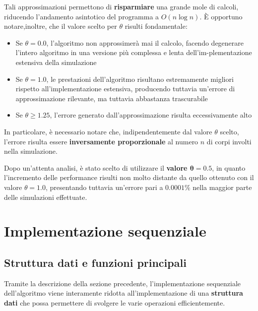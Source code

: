 \documentclass[12pt]{report}
\begin{document}
    Tali approssimazioni permettono di \textbf{risparmiare} una grande mole di calcoli, riducendo l'andamento asintotico del programma a $O(n \log n)$. È opportuno notare,inoltre, che il valore scelto per $\theta$ risulti fondamentale:
    \begin{itemize}
        \item Se $\theta = 0.0$, l'algoritmo non approssimerà mai il calcolo, facendo degenerare l'intero algoritmo in una versione più complessa e lenta dell'im-plementazione estensiva della simulazione
        \item Se $\theta = 1.0$, le prestazioni dell'algoritmo risultano estremamente migliori rispetto all'implementazione estensiva, producendo tuttavia un'errore di approssimazione rilevante, ma tuttavia abbastanza trascurabile
        \item Se $\theta \geq 1.25$, l'errore generato dall'approssimazione risulta eccessivamente alto
    \end{itemize}

    In particolare, è necessario notare che, indipendentemente dal valore $\theta$ scelto, l'errore risulta essere \textbf{inversamente proporzionale} al numero $n$ di corpi involti nella simulazione.

    Dopo un'attenta analisi, è stato scelto di utilizzare il \textbf{valore $\mathbf{\theta = 0.5}$}, in quanto l'incremento delle performance risulti non molto distante da quello ottenuto con il valore $\theta = 1.0$, presentando tuttavia un'errore pari a $0.0001\%$ nella maggior parte delle simulazioni effettuate.
    
    \quad

    \section{Implementazione sequenziale}

    \subsection{Struttura dati e funzioni principali}

    Tramite la descrizione della sezione precedente, l'implementazione sequenziale dell'algoritmo viene interamente ridotta all'implementazione di una \textbf{struttura dati} che possa permettere di svolgere le varie operazioni efficientemente.
    
\end{document}
